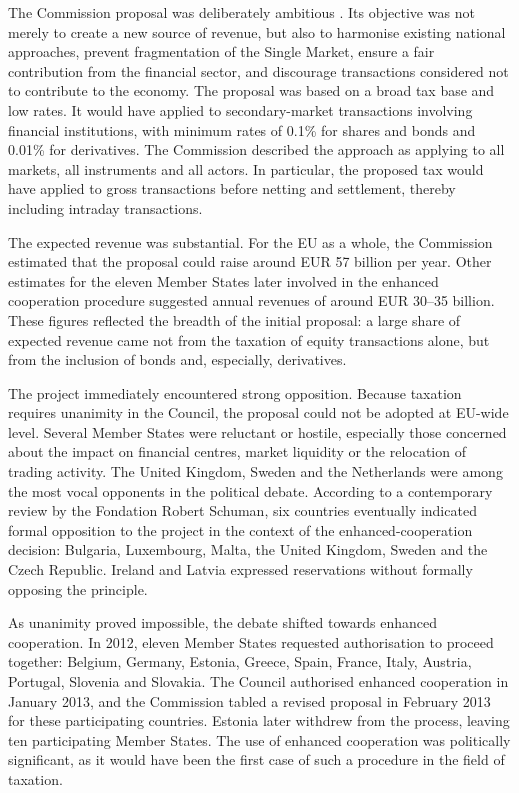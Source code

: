 \documentclass[../main]{subfiles}
\begin{document}
The Commission proposal was deliberately ambitious \citep{Gabor2016}. Its objective was not merely to create a new source of revenue, but also to harmonise existing national approaches, prevent fragmentation of the Single Market, ensure a fair contribution from the financial sector, and discourage transactions considered not to contribute to the economy. The proposal was based on a broad tax base and low rates. It would have applied to secondary-market transactions involving financial institutions, with minimum rates of 0.1\% for shares and bonds and 0.01\% for derivatives. The Commission described the approach as applying to all markets, all instruments and all actors. In particular, the proposed tax would have applied to gross transactions before netting and settlement, thereby including intraday transactions.

The expected revenue was substantial. For the EU as a whole, the Commission estimated that the proposal could raise around EUR 57 billion per year. Other estimates for the eleven Member States later involved in the enhanced cooperation procedure suggested annual revenues of around EUR 30--35 billion. These figures reflected the breadth of the initial proposal: a large share of expected revenue came not from the taxation of equity transactions alone, but from the inclusion of bonds and, especially, derivatives.

The project immediately encountered strong opposition. Because taxation requires unanimity in the Council, the proposal could not be adopted at EU-wide level. Several Member States were reluctant or hostile, especially those concerned about the impact on financial centres, market liquidity or the relocation of trading activity. The United Kingdom, Sweden and the Netherlands were among the most vocal opponents in the political debate. According to a contemporary review by the Fondation Robert Schuman, six countries eventually indicated formal opposition to the project in the context of the enhanced-cooperation decision: Bulgaria, Luxembourg, Malta, the United Kingdom, Sweden and the Czech Republic. Ireland and Latvia expressed reservations without formally opposing the principle.

As unanimity proved impossible, the debate shifted towards enhanced cooperation. In 2012, eleven Member States requested authorisation to proceed together: Belgium, Germany, Estonia, Greece, Spain, France, Italy, Austria, Portugal, Slovenia and Slovakia. The Council authorised enhanced cooperation in January 2013, and the Commission tabled a revised proposal in February 2013 for these participating countries. Estonia later withdrew from the process, leaving ten participating Member States. The use of enhanced cooperation was politically significant, as it would have been the first case of such a procedure in the field of taxation.
\end{document}
